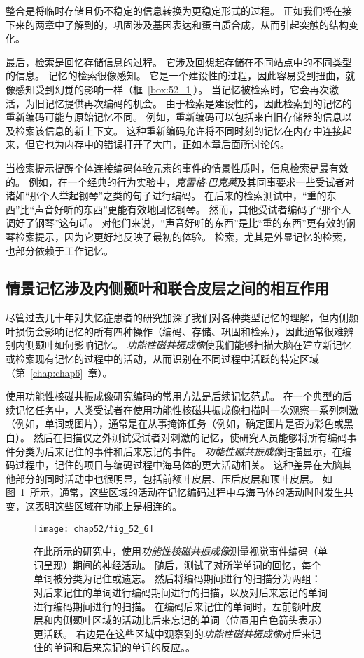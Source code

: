 整合是将临时存储且仍不稳定的信息转换为更稳定形式的过程。
正如我们将在接下来的两章中了解到的，巩固涉及基因表达和蛋白质合成，从而引起突触的结构变化。


最后，检索是回忆存储信息的过程。
它涉及回想起存储在不同站点中的不同类型的信息。
记忆的检索很像感知。
它是一个建设性的过程，因此容易受到扭曲，就像感知受到幻觉的影响一样（框~\ref{box:52_1}）。
当记忆被检索时，它会再次激活，为旧记忆提供再次编码的机会。
由于检索是建设性的，因此检索到的记忆的重新编码可能与原始记忆不同。
例如，重新编码可以包括来自旧存储器的信息以及检索该信息的新上下文。
这种重新编码允许将不同时刻的记忆在内存中连接起来，但它也为内存中的错误打开了大门，正如本章后面所讨论的。


当检索提示提醒个体连接编码体验元素的事件的情景性质时，信息检索是最有效的。
例如，在一个经典的行为实验中，\textit{克雷格$\cdot$巴克莱}及其同事要求一些受试者对诸如“那个人举起钢琴”之类的句子进行编码。
在后来的检索测试中，“重的东西”比“声音好听的东西”更能有效地回忆钢琴。
然而，其他受试者编码了“那个人调好了钢琴”这句话。
对他们来说，“声音好听的东西”是比“重的东西”更有效的钢琴检索提示，因为它更好地反映了最初的体验。
检索，尤其是外显记忆的检索，也部分依赖于工作记忆。



\subsection{情景记忆涉及内侧颞叶和联合皮层之间的相互作用}

尽管过去几十年对失忆症患者的研究加深了我们对各种类型记忆的理解，但内侧颞叶损伤会影响记忆的所有四种操作（编码、存储、巩固和检索），因此通常很难辨别内侧颞叶如何影响记忆。
\textit{功能性磁共振成像}使我们能够扫描大脑在建立新记忆或检索现有记忆的过程中的活动，从而识别在不同过程中活跃的特定区域（第~\ref{chap:chap6}~章）。


使用功能性核磁共振成像研究编码的常用方法是后续记忆范式。
在一个典型的后续记忆任务中，人类受试者在使用功能性核磁共振成像扫描时一次观察一系列刺激（例如，单词或图片），通常是在从事掩饰任务（例如，确定图片是否为彩色或黑白）。
然后在扫描仪之外测试受试者对刺激的记忆，使研究人员能够将所有编码事件分类为后来记住的事件和后来忘记的事件。
\textit{功能性磁共振成像}扫描显示，在编码过程中，记住的项目与编码过程中海马体的更大活动相关。
这种差异在大脑其他部分的同时活动中也很明显，包括前额叶皮层、压后皮层和顶叶皮层。
如图~\ref{fig:52_6}~所示，通常，这些区域的活动在记忆编码过程中与海马体的活动时时发生共变，这表明这些区域在功能上是相连的。


\begin{figure}[htbp]
	\centering
	\texttt{[image: chap52/fig\_52\_6]}
	\caption{在此所示的研究中，使用\textit{功能性核磁共振成像}测量视觉事件编码（单词呈现）期间的神经活动。
		随后，测试了对所学单词的回忆，每个单词被分类为记住或遗忘。
		然后将编码期间进行的扫描分为两组：对后来记住的单词进行编码期间进行的扫描，以及对后来忘记的单词进行编码期间进行的扫描。
		在编码后来记住的单词时，左前额叶皮层和内侧颞叶区域的活动比后来忘记的单词（位置用白色箭头表示）更活跃。
		右边是在这些区域中观察到的\textit{功能性磁共振成像}对后来记住的单词和后来忘记的单词的反应。\cite{wagner1998building}。}
	\label{fig:52_6}
\end{figure}


